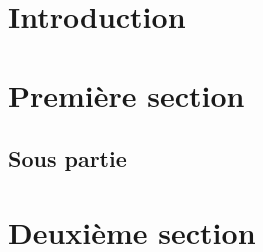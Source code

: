 \documentclass{rapportECM}
\begin{document}
\begin{center}
  \renewcommand{\abstractname}{Résumé}
	\begin{abstract}
    \lipsum[1-2]
  \end{abstract}
\end{center}

\begin{center}
  \renewcommand{\abstractname}{Abstract}
	\begin{abstract}
    \lipsum[1-2]
  \end{abstract}
\end{center}

\newpage

\pagestyle{introduction} %

\section*{Introduction}
\lipsum[2-3]
\newpage
\pagestyle{document}


\section{Première section}

\lipsum[3-4]

\subsection{Sous partie}

\lipsum[3-4]

\section{Deuxième section}

\lipsum[2-5]
\end{document}
